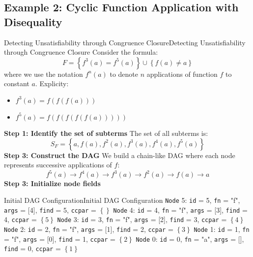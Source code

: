 \documentclass[a4paper]{article}
\theoremstyle{definition}
\begin{document}
\subsection{Example 2: Cyclic Function Application with Disequality}
\begin{example}{Detecting Unsatisfiability through Congruence Closure}{Detecting Unsatisfiability through Congruence Closure}
Consider the formula:
\[
  F = \left\{f^3(a) = f^5(a) \right\} \cup \left\{f(a) \neq a \right\}
\]
where we use the notation \( f^n(a) \) to denote \( n \) applications of function \( f \) to constant \( a \). 
Explicity:
\begin{itemize}
	\item \( f^3(a) = f(f(f(a))) \)    
	\item \( f^5(a) = f(f(f(f(f(a))))) \)
\end{itemize}
\end{example}
\textbf{Step 1: Identify the set of subterms}
\vspace{1em}
\noindent
\newline
The set of all subterms is:
\[
  S_F = \left\{a,f(a),f^2(a),f^3(a),f^4(a),f^5(a)\right\}
\]
\textbf{Step 3: Construct the DAG}
\vspace{1em}
\noindent
\newline
We build a chain-like DAG where each node represents successive applications of \( f \):
\[
  f^5(a) \rightarrow f^4(a) \rightarrow f^3(a) \rightarrow f^2(a) \rightarrow f(a) \rightarrow a 
\]
\textbf{Step 3: Initialize node fields}
\begin{definition}{Initial DAG Configuration}{Initial DAG Configuration}
\texttt{Node} 5: \texttt{id} = 5, \texttt{fn} = "f", \texttt{args} = [4], \texttt{find} = 5, \texttt{ccpar} = \( \left\{\right\} \)   
\newline 
\texttt{Node} 4: \texttt{id} = 4, \texttt{fn} = "f", \texttt{args} = [3], \texttt{find} = 4, \texttt{ccpar} = \( \left\{5\right\} \)   
\newline 
\texttt{Node} 3: \texttt{id} = 3, \texttt{fn} = "f", \texttt{args} = [2], \texttt{find} = 3, \texttt{ccpar} = \( \left\{4\right\} \)   
\newline 
\texttt{Node} 2: \texttt{id} = 2, \texttt{fn} = "f", \texttt{args} = [1], \texttt{find} = 2, \texttt{ccpar} = \( \left\{3\right\} \)   
\newline 
\texttt{Node} 1: \texttt{id} = 1, \texttt{fn} = "f", \texttt{args} = [0], \texttt{find} = 1, \texttt{ccpar} = \( \left\{2\right\} \)   
\newline 
\texttt{Node} 0: \texttt{id} = 0, \texttt{fn} = "a", \texttt{args} = [], \texttt{find} = 0, \texttt{ccpar} = \( \left\{1\right\} \)   
\end{definition}
\end{document}
